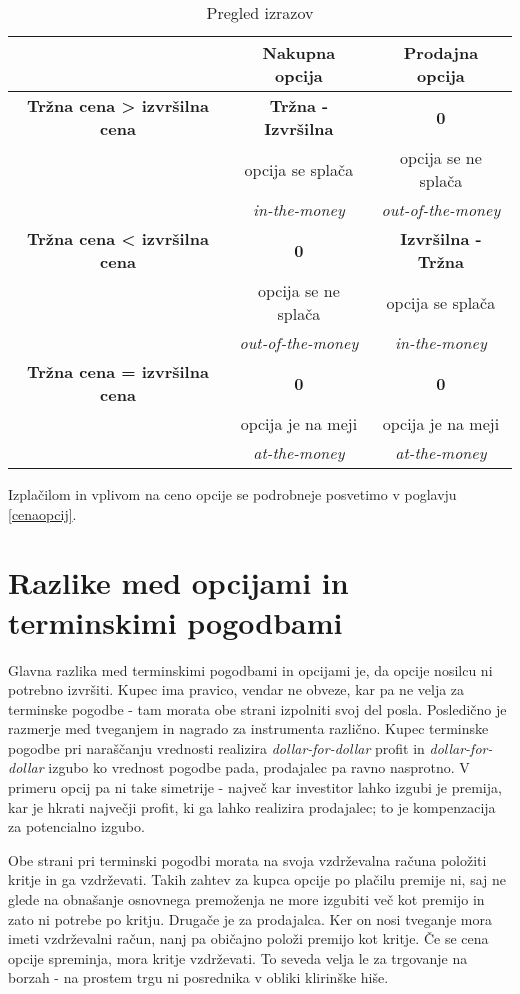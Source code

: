 \documentclass[a4paper]{article}
\begin{document}
\begin{table}[h]
    \centering
    \begin{tabular} { c | c | c }
        \toprule
        & Nakupna opcija & Prodajna opcija \\
        \hline
        \textbf{Tržna cena > izvršilna cena} & \textbf{Tržna - Izvršilna} & \textbf{0}  \\
        \hline
        & opcija se splača & opcija se ne splača \\ 
        & \textit{in-the-money} & \textit{out-of-the-money} \\
        \hline
        \textbf{Tržna cena < izvršilna cena} &\textbf{0} & \textbf{Izvršilna - Tržna} \\
        \hline
        & opcija se ne splača & opcija se splača \\
        & \textit{out-of-the-money} &\textit{in-the-money}\\ 
        \hline
        \textbf{Tržna cena = izvršilna cena} & \textbf{0} & \textbf{0} \\
        \hline
        & opcija je na meji & opcija je na meji \\
        & \textit{at-the-money} &  \textit{at-the-money} \\  
        \bottomrule
    \end{tabular}
    \caption{Pregled izrazov}
\end{table}
Izplačilom in vplivom na ceno opcije se podrobneje posvetimo v poglavju \ref{cenaopcij}.

\section{Razlike med opcijami in terminskimi pogodbami}
Glavna razlika med terminskimi pogodbami in opcijami je, da opcije nosilcu ni potrebno izvršiti. Kupec ima pravico,
vendar ne obveze, kar pa ne velja za terminske pogodbe - tam morata obe strani izpolniti svoj del posla.
Posledično je razmerje med tveganjem in nagrado za instrumenta različno. Kupec terminske pogodbe pri naraščanju vrednosti
realizira \textit{dollar-for-dollar} profit in \textit{dollar-for-dollar} izgubo ko vrednost pogodbe pada, prodajalec pa ravno nasprotno. V primeru
opcij pa ni take simetrije - največ kar investitor lahko izgubi je premija, kar je hkrati največji profit, ki ga lahko realizira prodajalec;
to je kompenzacija za potencialno izgubo.

Obe strani pri terminski pogodbi morata na svoja vzdrževalna računa položiti kritje in ga vzdrževati. Takih zahtev za kupca opcije
po plačilu premije ni, saj ne glede na obnašanje osnovnega premoženja ne more izgubiti več kot premijo in zato ni potrebe po kritju.
Drugače je za prodajalca. Ker on nosi tveganje mora imeti vzdrževalni račun, nanj pa običajno položi premijo kot kritje. Če se cena 
opcije spreminja, mora kritje vzdrževati. To seveda velja le za trgovanje na borzah - na prostem trgu ni posrednika v obliki klirinške hiše.
\end{document}
